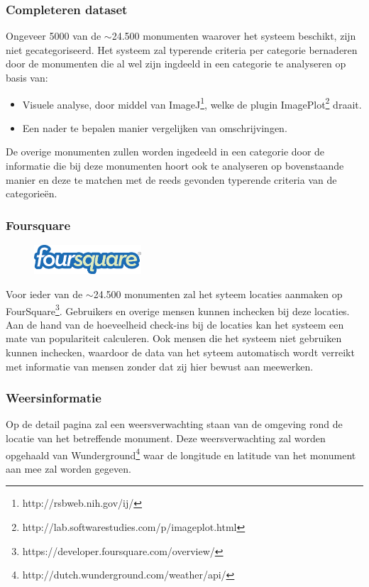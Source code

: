 \documentclass[a4paper,10pt]{article}
\begin{document}
			\subsubsection{Completeren dataset}
			Ongeveer 5000 van de $\sim$24.500 monumenten waarover het systeem beschikt, zijn niet gecategoriseerd. Het systeem zal typerende criteria per categorie bernaderen door de monumenten die al wel zijn ingdeeld in een categorie te analyseren op basis van:
				\begin{itemize}
					\item Visuele analyse, door middel van ImageJ\footnote{http://rsbweb.nih.gov/ij/}, welke de plugin ImagePlot\footnote{http://lab.softwarestudies.com/p/imageplot.html} draait.
					\item Een nader te bepalen manier vergelijken van omschrijvingen.
				\end{itemize}
			De overige monumenten zullen worden ingedeeld in een categorie door de informatie die bij deze monumenten hoort ook te analyseren op bovenstaande manier en deze te matchen met de reeds gevonden typerende criteria van de categorie\"en.
	
	        \subsubsection{Foursquare}
  			\begin{figure}
				\begin{center}
    					\includegraphics[width=4cm]{nunl-logo}
				\end{center}
			\end{figure}
			Voor ieder van de $\sim$24.500 monumenten zal het syteem locaties aanmaken op FourSquare\footnote{https://developer.foursquare.com/overview/}. Gebruikers en overige mensen kunnen inchecken bij deze locaties. Aan de hand van de hoeveelheid check-ins bij de locaties kan het systeem een mate van populariteit calculeren. Ook mensen die het systeem niet gebruiken kunnen inchecken, waardoor de data van het syteem automatisch wordt verreikt met informatie van mensen zonder dat zij hier bewust aan meewerken.
				
			\subsubsection{Weersinformatie}
			Op de detail pagina zal een weersverwachting staan van de omgeving rond de locatie van het betreffende monument. Deze weersverwachting zal worden opgehaald van Wunderground\footnote{http://dutch.wunderground.com/weather/api/} waar de longitude en latitude van het monument aan mee zal worden gegeven.
				
\end{document}
